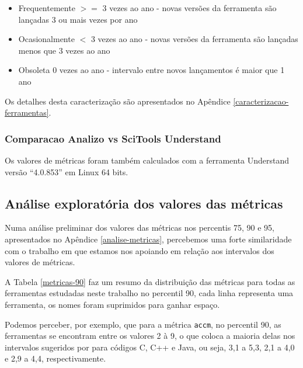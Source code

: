 \begin{itemize}
  \item Frequentemente $>=$ 3 vezes ao ano - novas versões da ferramenta são lançadas 3 ou mais vezes por ano
  \item Ocasionalmente $<$ 3 vezes ao ano - novas versões da ferramenta são lançadas menos que 3 vezes ao ano
  \item Obsoleta 0 vezes ao ano - intervalo entre novos lançamentos é maior que 1 ano
\end{itemize}

Os detalhes desta caracterização são apresentados no Apêndice \ref{caracterizacao-ferramentas}.

\subsubsection{Comparacao Analizo vs SciTools Understand}

Os valores de métricas foram também calculados com a ferramenta Understand
versão ``4.0.853'' em Linux 64 bits.

\subsection{Análise exploratória dos valores das métricas}

Numa análise preliminar dos valores das métricas nos percentis 75, 90 e 95,
apresentados no Apêndice \ref{analise-metricas}, percebemos uma forte
similaridade com o trabalho em que estamos nos apoiando \cite{Meirelles2013}
em relação aos intervalos dos valores de métricas.

A Tabela \ref{metricas-90} faz um resumo da distribuição das métricas para todas
as ferramentas estudadas neste trabalho no
percentil 90, cada linha
representa uma ferramenta, os nomes foram suprimidos para ganhar
espaço.


Podemos perceber, por exemplo, que para a métrica \texttt{accm}, no percentil 90,
as ferramentas se encontram entre os valores 2 à 9, o que coloca a maioria
delas nos intervalos sugeridos por \cite{Meirelles2013} para
códigos C, C++ e Java, ou seja, 3,1 a 5,3, 2,1 a 4,0 e 2,9 a 4,4,
respectivamente.

